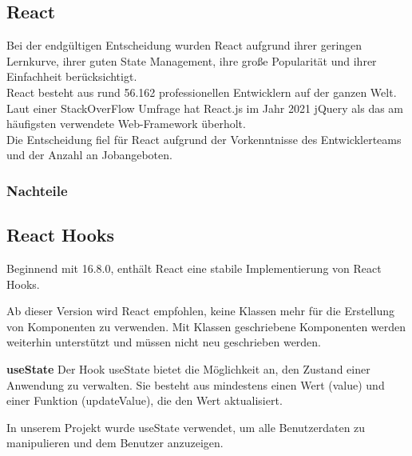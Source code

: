 

\subsection{React}
Bei der endgültigen Entscheidung wurden React aufgrund ihrer geringen Lernkurve, ihrer guten State Management, ihre große Popularität und ihrer Einfachheit berücksichtigt.
\\
React besteht aus rund 56.162 professionellen Entwicklern auf der ganzen Welt.
Laut einer StackOverFlow Umfrage hat React.js im Jahr 2021 jQuery als das am häufigsten verwendete Web-Framework überholt. {\cite{SO01}}
\\
Die Entscheidung fiel für React aufgrund der Vorkenntnisse des Entwicklerteams und der Anzahl an Jobangeboten.


\subsubsection{Nachteile}

\subsection{React Hooks}
Beginnend mit 16.8.0, enthält React eine stabile Implementierung von React Hooks.

Ab dieser Version wird React empfohlen, keine Klassen mehr für die Erstellung von Komponenten zu verwenden.
Mit Klassen geschriebene Komponenten werden weiterhin unterstützt und müssen nicht neu geschrieben werden.
  {\cite{R05}}

\textbf{useState}
Der Hook useState bietet die Möglichkeit an, den Zustand einer Anwendung zu verwalten. Sie besteht aus mindestens einen Wert (value) und einer Funktion (updateValue), die den Wert aktualisiert.

In unserem Projekt wurde useState verwendet, um alle Benutzerdaten zu manipulieren und dem Benutzer anzuzeigen.

